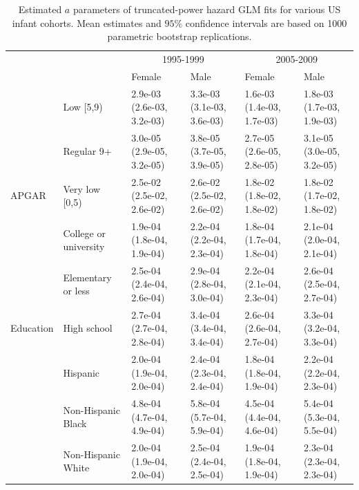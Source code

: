 \documentclass[smallextended]{svjour3} %
\begin{document}
\clearpage

\begin{landscape}\begin{table}[t]

\caption{\label{tab:tab-ci-a}Estimated $a$ parameters of truncated-power hazard GLM fits for various US infant cohorts. Mean estimates and $95\%$ confidence intervals are based on 1000 parametric bootstrap replications.}
\centering
\begin{tabular}{llllll}
\toprule
\multicolumn{2}{c}{ } & \multicolumn{2}{c}{1995-1999} & \multicolumn{2}{c}{2005-2009} \\
\cmidrule(l{3pt}r{3pt}){3-4} \cmidrule(l{3pt}r{3pt}){5-6}
 &  & Female & Male & Female & Male\\
\midrule
 & Low [5,9) & 2.9e-03 (2.6e-03, 3.2e-03) & 3.3e-03 (3.1e-03, 3.6e-03) & 1.6e-03 (1.4e-03, 1.7e-03) & 1.8e-03 (1.7e-03, 1.9e-03)\\

 & Regular 9+ & 3.0e-05 (2.9e-05, 3.2e-05) & 3.8e-05 (3.7e-05, 3.9e-05) & 2.7e-05 (2.6e-05, 2.8e-05) & 3.1e-05 (3.0e-05, 3.2e-05)\\

\multirow{-3}{*}{\raggedright\arraybackslash APGAR} & Very low [0,5) & 2.5e-02 (2.5e-02, 2.6e-02) & 2.6e-02 (2.5e-02, 2.6e-02) & 1.8e-02 (1.8e-02, 1.8e-02) & 1.8e-02 (1.7e-02, 1.8e-02)\\
\cmidrule{1-6}
 & College or university & 1.9e-04 (1.8e-04, 1.9e-04) & 2.2e-04 (2.2e-04, 2.3e-04) & 1.8e-04 (1.7e-04, 1.8e-04) & 2.1e-04 (2.0e-04, 2.1e-04)\\

 & Elementary or less & 2.5e-04 (2.4e-04, 2.6e-04) & 2.9e-04 (2.8e-04, 3.0e-04) & 2.2e-04 (2.1e-04, 2.3e-04) & 2.6e-04 (2.5e-04, 2.7e-04)\\

\multirow{-3}{*}{\raggedright\arraybackslash Education} & High school & 2.7e-04 (2.7e-04, 2.8e-04) & 3.4e-04 (3.4e-04, 3.4e-04) & 2.6e-04 (2.6e-04, 2.7e-04) & 3.3e-04 (3.2e-04, 3.3e-04)\\
\cmidrule{1-6}
 & Hispanic & 2.0e-04 (1.9e-04, 2.0e-04) & 2.4e-04 (2.3e-04, 2.4e-04) & 1.8e-04 (1.8e-04, 1.9e-04) & 2.2e-04 (2.2e-04, 2.3e-04)\\

 & Non-Hispanic Black & 4.8e-04 (4.7e-04, 4.9e-04) & 5.8e-04 (5.7e-04, 5.9e-04) & 4.5e-04 (4.4e-04, 4.6e-04) & 5.4e-04 (5.3e-04, 5.5e-04)\\

 & Non-Hispanic White & 2.0e-04 (1.9e-04, 2.0e-04) & 2.5e-04 (2.4e-04, 2.5e-04) & 1.9e-04 (1.8e-04, 1.9e-04) & 2.3e-04 (2.3e-04, 2.3e-04)\\


\end{tabular}
\end{table}
\end{landscape}
\end{document}
